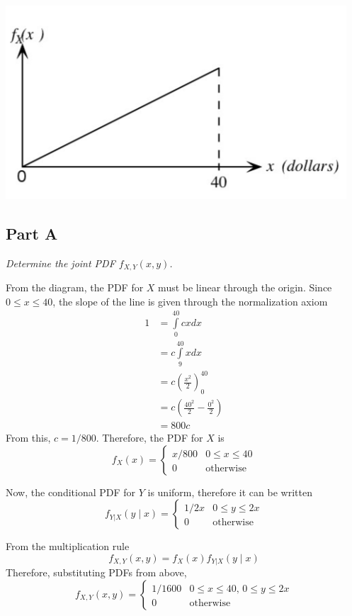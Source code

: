 \documentclass{article}
\begin{document}
\begin{center}
    \includegraphics[scale=1]{Images/P3.PNG}
\end{center}

\subsection*{Part A}

\textit{Determine the joint PDF $ f_{X,Y}(x, y) $.}

\bigbreak

From the diagram, the PDF for $X$ must be linear through the origin. Since $
0 \leq x \leq 40 $, the slope of the line is given through the normalization
axiom
\begin{align*}
    1 &= \int\limits_0^{40} c x dx \\
    &= c \int\limits_9^{40} x dx \\
    &= c \left( \frac{x^2}{2} \right)_0^{40} \\
    &= c \left( \frac{40^2}{2} - \frac{0^2}{2} \right) \\
    &= 800 c
\end{align*}
From this, $ c = 1/800 $.
Therefore, the PDF for $X$ is 
$$ f_X(x) = \begin{cases}
    x / 800 & 0 \leq x \leq 40 \\
    0 & \mathrm{otherwise}
\end{cases} $$

Now, the conditional PDF for $Y$ is uniform, therefore it can be written
$$ f_{Y|X}(y \mid x) = \begin{cases}
    1 / 2x & 0 \leq y \leq 2x \\
    0 & \mathrm{otherwise}
\end{cases} $$

From the multiplication rule
$$ f_{X,Y} (x, y) = f_X(x) f_{Y|X}(y \mid x) $$
Therefore, substituting PDFs from above,
$$ f_{X,Y} (x, y) = \begin{cases}
    1 / 1600 & 0 \leq x \leq 40,\, 0 \leq y \leq 2x \\
    0 & \mathrm{otherwise}
\end{cases} $$
\end{document}
